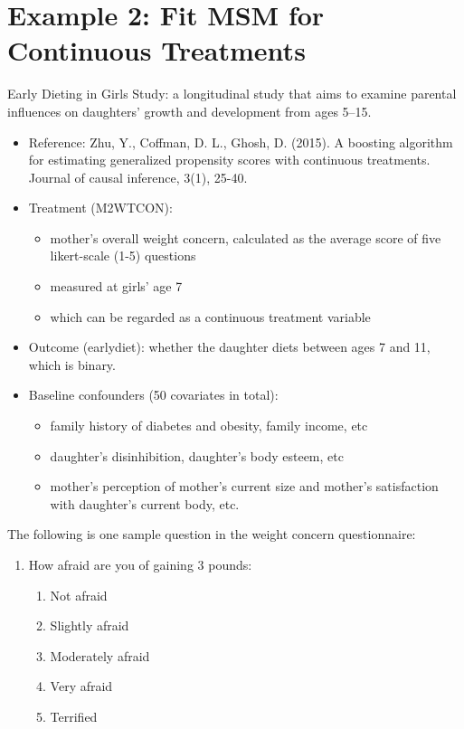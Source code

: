 \documentclass[oneside]{book}\usepackage[]{graphicx}\usepackage[svgnames]{xcolor}
\begin{document}
\section{Example 2: Fit MSM for Continuous Treatments}
Early Dieting in Girls Study: a longitudinal study that aims to examine
parental influences on daughters' growth and development from ages 5--15.
\begin{itemize}
    \item Reference: Zhu, Y., Coffman, D. L., Ghosh, D. (2015). A boosting algorithm for estimating generalized propensity
          scores with continuous treatments. Journal of causal inference, 3(1), 25-40.
\end{itemize}
\begin{itemize}
    \item Treatment (M2WTCON):
          \begin{itemize}
              \item mother's overall weight concern, calculated as the average
                    score of five likert-scale (1-5) questions
              \item measured at girls' age 7
              \item which can be regarded as a continuous treatment variable
          \end{itemize}
    \item Outcome (earlydiet): whether the daughter diets between
          ages 7 and 11, which is binary.
    \item Baseline confounders (50 covariates in total):
          \begin{itemize}
              \item family history of diabetes and obesity, family income, etc
              \item daughter's disinhibition, daughter's body esteem, etc
              \item mother's perception of mother's current size and mother's
                    satisfaction with daughter's current body, etc.
          \end{itemize}
\end{itemize}
The following is one sample question in the weight concern
questionnaire:
\begin{enumerate}
    \item How afraid are you of gaining 3 pounds:
          \begin{enumerate}[(1)]
              \item Not afraid
              \item Slightly afraid
              \item Moderately afraid
              \item Very afraid
              \item Terrified
          \end{enumerate}
\end{enumerate}
\end{document}
